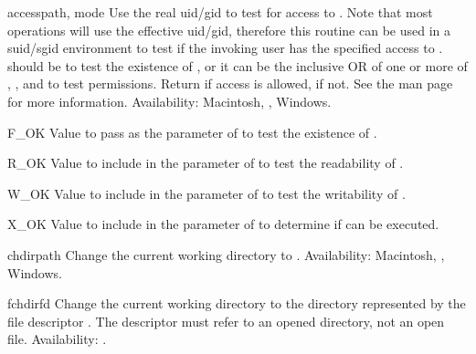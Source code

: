 \begin{funcdesc}{access}{path, mode}
Use the real uid/gid to test for access to .  Note that most
operations will use the effective uid/gid, therefore this routine can
be used in a suid/sgid environment to test if the invoking user has the
specified access to .   should be 
to test the existence of , or it can be the inclusive OR of
one or more of , , and  to
test permissions.  Return  if access is allowed,
 if not.
See the \UNIX{} man page  for more information.
Availability: Macintosh, \UNIX, Windows.

\end{funcdesc}

\begin{datadesc}{F_OK}
  Value to pass as the  parameter of  to
  test the existence of .
\end{datadesc}

\begin{datadesc}{R_OK}
  Value to include in the  parameter of 
  to test the readability of .
\end{datadesc}

\begin{datadesc}{W_OK}
  Value to include in the  parameter of 
  to test the writability of .
\end{datadesc}

\begin{datadesc}{X_OK}
  Value to include in the  parameter of 
  to determine if  can be executed.
\end{datadesc}

\begin{funcdesc}{chdir}{path}
Change the current working directory to .
Availability: Macintosh, \UNIX, Windows.
\end{funcdesc}

\begin{funcdesc}{fchdir}{fd}
Change the current working directory to the directory represented by
the file descriptor .  The descriptor must refer to an opened
directory, not an open file.
Availability: \UNIX.
\end{funcdesc}

